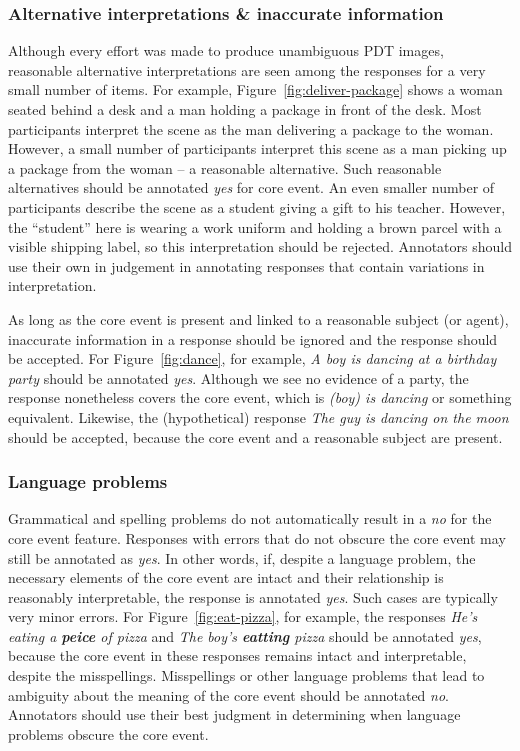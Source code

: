 \documentclass[12pt,notitlepage]{article}
\begin{document}
\subsubsection{Alternative interpretations \& inaccurate information} Although every effort was made to produce unambiguous PDT images, reasonable alternative interpretations are seen among the responses for a very small number of items. For example, Figure~\ref{fig:deliver-package} shows a woman seated behind a desk and a man holding a package in front of the desk. Most participants interpret the scene as the man delivering a package to the woman. However, a small number of participants interpret this scene as a man picking up a package from the woman -- a reasonable alternative. Such reasonable alternatives should be annotated \textit{yes} for core event. An even smaller number of participants describe the scene as a student giving a gift to his teacher. However, the ``student'' here is wearing a work uniform and holding a brown parcel with a visible shipping label, so this interpretation should be rejected. Annotators should use their own in judgement in annotating responses that contain variations in interpretation.

As long as the core event is present and linked to a reasonable subject (or agent), inaccurate information in a response should be ignored and the response should be accepted. For Figure~\ref{fig:dance}, for example, \textit{A boy is dancing at a birthday party} should be annotated \textit{yes}. Although we see no evidence of a party, the response nonetheless covers the core event, which is \textit{(boy) is dancing} or something equivalent. Likewise, the (hypothetical) response \textit{The guy is dancing on the moon} should be accepted, because the core event and a reasonable subject are present.

\subsubsection{Language problems} Grammatical and spelling problems do not automatically result in a \textit{no} for the core event feature. Responses with errors that do not obscure the core event may still be annotated as \textit{yes}. In other words, if, despite a language problem, the necessary elements of the core event are intact and their relationship is reasonably interpretable, the response is annotated \textit{yes}. Such cases are typically very minor errors. For Figure~\ref{fig:eat-pizza}, for example, the responses \textit{He's eating a \textbf{peice} of pizza} and \textit{The boy's \textbf{eatting} pizza} should be annotated \textit{yes}, because the core event in these responses remains intact and interpretable, despite the misspellings. Misspellings or other language problems that lead to ambiguity about the meaning of the core event should be annotated \textit{no}. Annotators should use their best judgment in determining when language problems obscure the core event.
\end{document}
